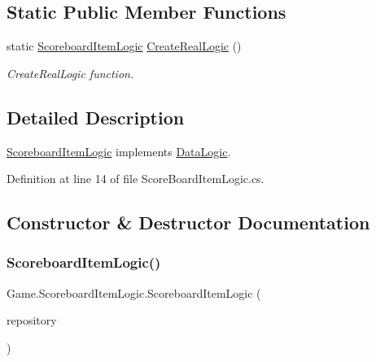 \subsection*{Static Public Member Functions}
\begin{DoxyCompactItemize}
\item 
static \mbox{\hyperlink{class_game_1_1_scoreboard_item_logic}{Scoreboard\+Item\+Logic}} \mbox{\hyperlink{class_game_1_1_scoreboard_item_logic_a92667ef5e19216241aec97a9e05db5cf}{Create\+Real\+Logic}} ()
\begin{DoxyCompactList}\small\item\em Create\+Real\+Logic function. \end{DoxyCompactList}\end{DoxyCompactItemize}


\subsection{Detailed Description}
\mbox{\hyperlink{class_game_1_1_scoreboard_item_logic}{Scoreboard\+Item\+Logic}} implements \mbox{\hyperlink{class_game_1_1_data_logic}{Data\+Logic}}. 



Definition at line 14 of file Score\+Board\+Item\+Logic.\+cs.



\subsection{Constructor \& Destructor Documentation}
\mbox{\label{class_game_1_1_scoreboard_item_logic_a813276764b0e14eb8c3063a2683446d4}} 
\subsubsection{\texorpdfstring{ScoreboardItemLogic()}{ScoreboardItemLogic()}}
{\footnotesize\ttfamily Game.\+Scoreboard\+Item\+Logic.\+Scoreboard\+Item\+Logic (\begin{DoxyParamCaption}\item[{\mbox{\hyperlink{interface_game_1_1_i_repository}{I\+Repository}}$<$ \mbox{\hyperlink{class_game_1_1_data_1_1scoreboard__items}{scoreboard\+\_\+items}} $>$}]{repository }\end{DoxyParamCaption})}



